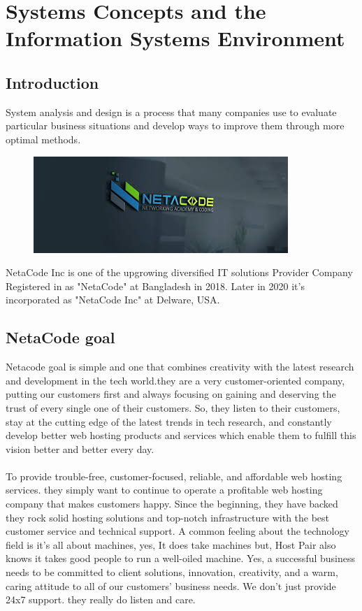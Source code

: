 \documentclass[a4paper,12pt]{report}
\begin{document}
\chapter{Systems Concepts and the Information Systems Environment}
\section{Introduction}
 System analysis and design is a process that many companies use to evaluate particular business situations and develop ways to improve them through more optimal methods.\\
 
\begin{figure}[h]
	\centering
	\includegraphics[width=0.9\linewidth]{1_1}
	\label{fig:11}
\end{figure}

NetaCode Inc is one of the upgrowing diversified IT solutions Provider Company Registered in as "NetaCode" at Bangladesh in 2018. Later in 2020 it's incorporated as "NetaCode Inc" at Delware, USA.
\section{NetaCode goal}
Netacode goal is simple and one that combines creativity with the latest research and development in the tech
world.they are a very customer-oriented company, putting our customers first and always focusing on
gaining and deserving the trust of every single one of their customers. So, they listen to their customers, stay
at the cutting edge of the latest trends in tech research, and constantly develop better web hosting
products and services which enable them to fulfill this vision better and better every day.
\\
\\
 
To provide trouble-free, customer-focused, reliable, and affordable web hosting services. they simply want
to continue to operate a profitable web hosting company that makes customers happy. Since the
beginning, they have backed they rock solid hosting solutions and top-notch infrastructure with the best
customer service and technical support. A common feeling about the technology field is it's all about
machines, yes, It does take machines but, Host Pair also knows it takes good people to run a well-oiled
machine. Yes, a successful business needs to be committed to client solutions, innovation, creativity, and
a warm, caring attitude to all of our customers' business needs. We don't just provide 24x7 support. they
really do listen and care.
\end{document}
